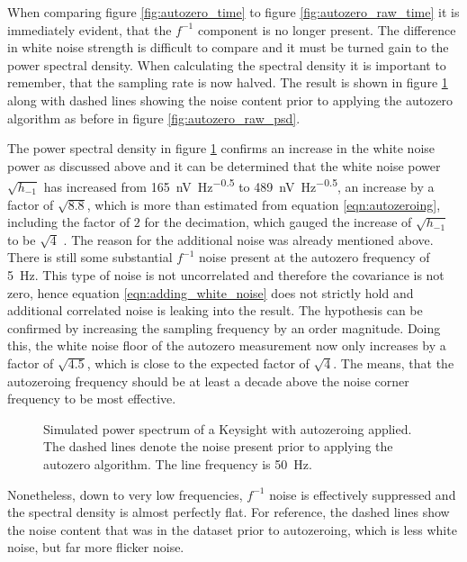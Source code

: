 When comparing figure \ref{fig:autozero_time} to figure \ref{fig:autozero_raw_time} it is immediately evident, that the $f^{-1}$ component is no longer present. The difference in white noise strength is difficult to compare and it must be turned gain to the power spectral density. When calculating the spectral density it is important to remember, that the sampling rate is now halved. The result is shown in figure \ref{fig:autozero_psd} along with dashed lines showing the noise content prior to applying the autozero algorithm as before in figure \ref{fig:autozero_raw_psd}.

The power spectral density in figure \ref{fig:autozero_psd} confirms an increase in the white noise power as discussed above and it can be determined that the white noise power $\sqrt{h_{-1}}$ has increased from \qty[power-half-as-sqrt, per-mode=symbol]{165}{\nV \Hz\tothe{-0.5}} to \qty[power-half-as-sqrt, per-mode=symbol]{489}{\nV \Hz\tothe{-0.5}}, an increase by a factor of $\sqrt{8.8}$, which is more than estimated from equation \ref{eqn:autozeroing}, including the factor of $2$ for the decimation, which gauged the increase of $\sqrt{h_{-1}}$ to be $\sqrt{4}$ . The reason for the additional noise was already mentioned above. There is still some substantial $f^{-1}$ noise present at the autozero frequency of \qty{5}{\Hz}. This type of noise is not uncorrelated and therefore the covariance is not zero, hence equation \ref{eqn:adding_white_noise} does not strictly hold and additional correlated noise is leaking into the result. The hypothesis can be confirmed by increasing the sampling frequency by an order magnitude. Doing this, the white noise floor of the autozero measurement now only increases by a factor of $\sqrt{4.5}$, which is close to the expected factor of $\sqrt{4}$. The means, that the autozeroing frequency should be at least a decade above the noise corner frequency to be most effective.

\begin{figure}[ht]
    \centering
    
    \caption{Simulated power spectrum of a Keysight  with autozeroing applied. The dashed lines denote the noise present prior to applying the autozero algorithm. The line frequency is \qty{50}{\Hz}.}
    \label{fig:autozero_psd}
\end{figure}

Nonetheless, down to very low frequencies, $f^{-1}$ noise is effectively suppressed and the spectral density is almost perfectly flat. For reference, the dashed lines show the noise content that was in the dataset prior to autozeroing, which is less white noise, but far more flicker noise.

